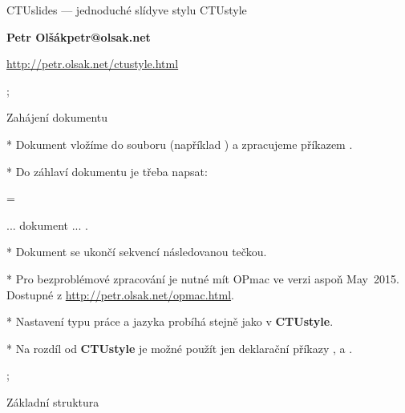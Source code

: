 

\worktype[O/CZ]

\slideshow 

\tit CTUslides ---\nl 
     jednoduché slídy\nl ve stylu CTUstyle

\subtit\bf Petr Olšák\nl petr@olsak.net

\subtit\rm \url{http://petr.olsak.net/ctustyle.html}

\pg; %

\sec Zahájení dokumentu

* Dokument vložíme do souboru (například )\nl
  a zpracujeme příkazem .

* Do záhlaví dokumentu je třeba napsat:

\pg=\typosize[13/15]\begtt
\worktype[B/CZ]  %

\slideshow       %
... dokument ...
\pg.
\endtt

* Dokument se ukončí sekvencí \code{\\pg} následovanou tečkou.

* Pro bezproblémové zpracování je nutné mít OPmac ve verzi aspoň May~2015.
  Dostupné z \url{http://petr.olsak.net/opmac.html}.

* Nastavení typu práce a jazyka probíhá stejně jako v {\bf\Blue CTUstyle}.

* Na rozdíl od {\bf\Blue CTUstyle} je možné použít jen deklarační
  příkazy \code{\\worktype}, \code{\\faculty} a \code{\\department}.

\pg; %

\sec Základní struktura

